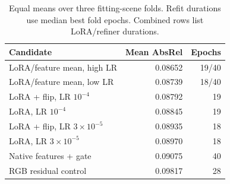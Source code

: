 \begin{table}[t]
\centering\small
\caption{Equal means over three fitting-scene folds. Refit durations use median best fold epochs. Combined rows list LoRA/refiner durations.}
\begin{tabular}{lrr}
\toprule
Candidate & Mean AbsRel & Epochs\\
\midrule
LoRA/feature mean, high LR & 0.08652 & 19/40\\
LoRA/feature mean, low LR & 0.08739 & 18/40\\
LoRA + flip, LR $10^{-4}$ & 0.08792 & 19\\
LoRA, LR $10^{-4}$ & 0.08845 & 19\\
LoRA + flip, LR $3\times10^{-5}$ & 0.08935 & 18\\
LoRA, LR $3\times10^{-5}$ & 0.08970 & 18\\
Native features + gate & 0.09075 & 40\\
RGB residual control & 0.09817 & 28\\
\bottomrule
\end{tabular}
\end{table}
